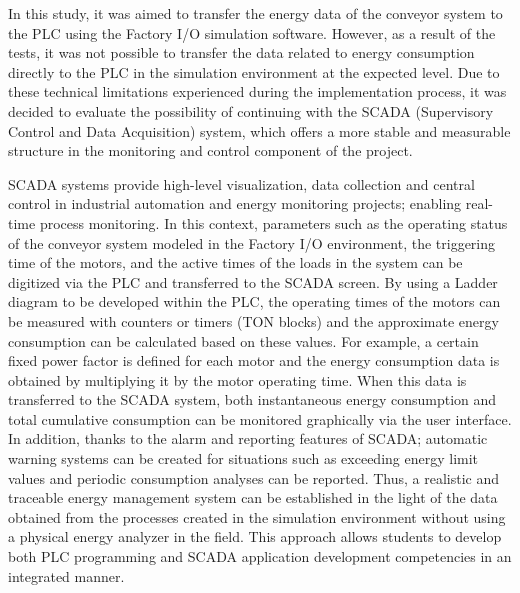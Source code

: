 In this study, it was aimed to transfer the energy data of the conveyor system to the PLC using the Factory I/O simulation software. However, as a result of the tests, it was not possible to transfer the data related to energy consumption directly to the PLC in the simulation environment at the expected level. Due to these technical limitations experienced during the implementation process, it was decided to evaluate the possibility of continuing with the SCADA (Supervisory Control and Data Acquisition) system, which offers a more stable and measurable structure in the monitoring and control component of the project.

SCADA systems provide high-level visualization, data collection and central control in industrial automation and energy monitoring projects; enabling real-time process monitoring. In this context, parameters such as the operating status of the conveyor system modeled in the Factory I/O environment, the triggering time of the motors, and the active times of the loads in the system can be digitized via the PLC and transferred to the SCADA screen. By using a Ladder diagram to be developed within the PLC, the operating times of the motors can be measured with counters or timers (TON blocks) and the approximate energy consumption can be calculated based on these values. For example, a certain fixed power factor is defined for each motor and the energy consumption data is obtained by multiplying it by the motor operating time. When this data is transferred to the SCADA system, both instantaneous energy consumption and total cumulative consumption can be monitored graphically via the user interface. In addition, thanks to the alarm and reporting features of SCADA; automatic warning systems can be created for situations such as exceeding energy limit values ​​and periodic consumption analyses can be reported. Thus, a realistic and traceable energy management system can be established in the light of the data obtained from the processes created in the simulation environment without using a physical energy analyzer in the field. This approach allows students to develop both PLC programming and SCADA application development competencies in an integrated manner.

\medskip

\clearpage